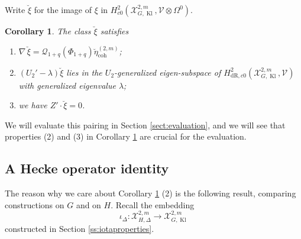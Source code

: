 \documentclass[cjm]{ipart}
\theoremstyle{plain}
\newtheorem{corollary}[theorem]{Corollary}
\theoremstyle{remark}
\DeclareMathOperator{\coh}{coh}
\DeclareMathOperator{\fp}{fp}
\DeclareMathOperator{\Kl}{Kl}
\newcommand{\cP}{\mathcal{P}}
\newcommand{\cQ}{\mathcal{Q}}
\newcommand{\cV}{\mathcal{V}}
\newcommand{\cX}{\mathcal{X}}
\newcommand{\dR}{\mathrm{dR}}
\numberwithin{equation}{subsection}
\begin{document}
Write $\breve\xi$ for the image of $\xi$ in $H^2_{c0}(\cX^{2,m}_{G,\Kl},\cV\otimes\Omega^0)$.

\begin{corollary}\label{cor:goodxiprop}
 The class $\breve\xi$ satisfies
 \begin{enumerate}
  \item $\nabla\, \breve\xi=\cQ_{1+q}(\Phi_{1+q})\breve\eta_{\coh}^{(2,m)}$;
  \item $(U_2'-\lambda)\breve\xi$ lies in the $U_2$-generalized eigen-subspace of $H^2_{\dR,c0}(\cX^{2,m}_{G,\Kl},\cV)$ with generalized eigenvalue $\lambda$;
  \item we have $Z'\cdot\breve\xi=0$.
 \end{enumerate}
\end{corollary}


   We will evaluate this pairing in Section \ref{sect:evaluation}, and we will see that properties (2) and (3) in Corollary \ref{cor:goodxiprop} are crucial for the evaluation.






 \subsection{A Hecke operator identity}
 \label{sect:weirdidentity}

  The reason why we care about Corollary \ref{cor:goodxiprop} (2) is the following result, comparing constructions on $G$ and on $H$. Recall the embedding
  \[ \iota_\Delta: \cX_{H, \Delta}^{2,m} \to \cX_{G, \Kl}^{2,m} \]
  constructed in Section \ref{ss:iotaproperties}.
\end{document}
